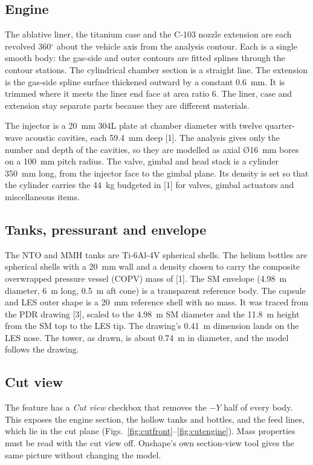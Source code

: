 \documentclass[10pt]{article}
\begin{document}
\subsection{Engine}
The ablative liner, the titanium case and the C-103 nozzle extension are each revolved 360$^\circ$ about the vehicle axis
from the analysis contour. Each is a single smooth body: the gas-side and outer contours are fitted splines through the
contour stations. The cylindrical chamber section is a straight line. The extension is the gas-side spline surface
thickened outward by a constant 0.6~mm. It is trimmed where it meets the liner end face at area ratio 6. The liner, case
and extension stay separate parts because they are different materials.

The injector is a 20~mm 304L plate at chamber diameter with twelve quarter-wave acoustic cavities, each 59.4~mm deep [1].
The analysis gives only the number and depth of the cavities, so they are modelled as axial \O16~mm bores on a 100~mm
pitch radius. The valve, gimbal and head stack is a cylinder 350~mm long, from the injector face to the gimbal plane. Its
density is set so that the cylinder carries the 44~kg budgeted in [1] for valves, gimbal actuators and miscellaneous items.

\subsection{Tanks, pressurant and envelope}
The NTO and MMH tanks are Ti-6Al-4V spherical shells. The helium bottles are spherical shells with a 20~mm wall and a
density chosen to carry the composite overwrapped pressure vessel (COPV) mass of [1]. The SM envelope (4.98~m diameter,
6~m long, 0.5~m aft cone) is a transparent reference body. The capsule and LES outer shape is a 20~mm reference shell with
no mass. It was traced from the PDR drawing [3], scaled to the 4.98~m SM diameter and the 11.8~m height from the SM top
to the LES tip. The drawing's 0.41~m dimension lands on the LES nose. The tower, as drawn, is about 0.74~m in diameter,
and the model follows the drawing.

\subsection{Cut view}
The feature has a \emph{Cut view} checkbox that removes the $-Y$ half of every body. This exposes the engine section, the
hollow tanks and bottles, and the feed lines, which lie in the cut plane (Figs.~\ref{fig:cutfront}--\ref{fig:cutengine}).
Mass properties must be read with the cut view off. Onshape's own section-view tool gives the same picture without
changing the model.
\end{document}
